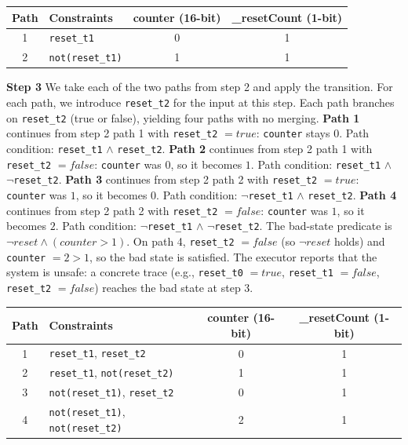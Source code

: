 \documentclass[11pt]{article}
\begin{document}
\begin{center}
\begin{tabular}{|c|l|c|c|}
\hline
\textbf{Path} & \textbf{Constraints} & \textbf{counter (16-bit)} & \textbf{\_resetCount (1-bit)} \\
\hline
1 & \texttt{reset\_t1} & 0 & 1 \\
2 & \texttt{not(reset\_t1)} & 1 & 1 \\
\hline
\end{tabular}
\end{center}

\textbf{Step 3} We take each of the two paths from step 2 and apply the transition. For each path, we introduce \texttt{reset\_t2} for the input at this step. Each path branches on \texttt{reset\_t2} (true or false), yielding four paths with no merging. \textbf{Path 1} continues from step 2 path 1 with \texttt{reset\_t2} $= \mathit{true}$: \texttt{counter} stays $0$. Path condition: \texttt{reset\_t1} $\land$ \texttt{reset\_t2}. \textbf{Path 2} continues from step 2 path 1 with \texttt{reset\_t2} $= \mathit{false}$: \texttt{counter} was $0$, so it becomes $1$. Path condition: \texttt{reset\_t1} $\land$ $\neg$\texttt{reset\_t2}. \textbf{Path 3} continues from step 2 path 2 with \texttt{reset\_t2} $= \mathit{true}$: \texttt{counter} was $1$, so it becomes $0$. Path condition: $\neg$\texttt{reset\_t1} $\land$ \texttt{reset\_t2}. \textbf{Path 4} continues from step 2 path 2 with \texttt{reset\_t2} $= \mathit{false}$: \texttt{counter} was $1$, so it becomes $2$. Path condition: $\neg$\texttt{reset\_t1} $\land$ $\neg$\texttt{reset\_t2}. The bad-state predicate is $\neg\mathit{reset} \land (\mathit{counter} > 1)$. On path 4, \texttt{reset\_t2} $= \mathit{false}$ (so $\neg\mathit{reset}$ holds) and \texttt{counter} $= 2 > 1$, so the bad state is satisfied. The executor reports that the system is unsafe: a concrete trace (e.g., \texttt{reset\_t0} $= \mathit{true}$, \texttt{reset\_t1} $= \mathit{false}$, \texttt{reset\_t2} $= \mathit{false}$) reaches the bad state at step 3.

\begin{center}
\begin{tabular}{|c|l|c|c|}
\hline
\textbf{Path} & \textbf{Constraints} & \textbf{counter (16-bit)} & \textbf{\_resetCount (1-bit)} \\
\hline
1 & \texttt{reset\_t1}, \texttt{reset\_t2} & 0 & 1 \\
2 & \texttt{reset\_t1}, \texttt{not(reset\_t2)} & 1 & 1 \\
3 & \texttt{not(reset\_t1)}, \texttt{reset\_t2} & 0 & 1 \\
4 & \texttt{not(reset\_t1)}, \texttt{not(reset\_t2)} & 2 & 1 \\
\hline
\end{tabular}
\end{center}
\end{document}
